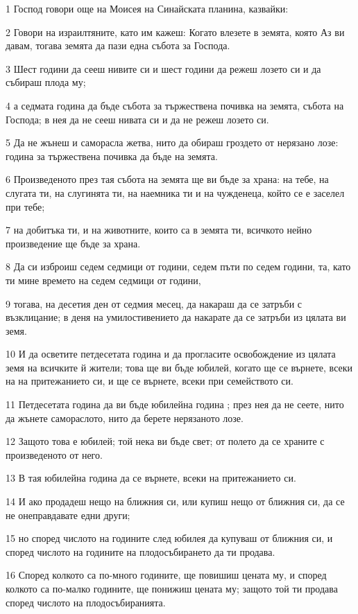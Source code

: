\par 1 Господ говори още на Моисея на Синайската планина, казвайки:
\par 2 Говори на израилтяните, като им кажеш: Когато влезете в земята, която Аз ви давам, тогава земята да пази една събота за Господа.
\par 3 Шест години да сееш нивите си и шест години да режеш лозето си и да събираш плода му;
\par 4 а седмата година да бъде събота за тържествена почивка на земята, събота на Господа; в нея да не сееш нивата си и да не режеш лозето си.
\par 5 Да не жънеш и саморасла жетва, нито да обираш гроздето от нерязано лозе: година за тържествена почивка да бъде на земята.
\par 6 Произведеното през тая събота на земята ще ви бъде за храна: на тебе, на слугата ти, на слугинята ти, на наемника ти и на чужденеца, който се е заселел при тебе;
\par 7 на добитъка ти, и на животните, които са в земята ти, всичкото нейно произведение ще бъде за храна.
\par 8 Да си изброиш седем седмици от години, седем пъти по седем години, та, като ти мине времето на седем седмици от години,
\par 9 тогава, на десетия ден от седмия месец, да накараш да се затръби с възклицание; в деня на умилостивението да накарате да се затръби из цялата ви земя.
\par 10 И да осветите петдесетата година и да прогласите освобождение из цялата земя на всичките й жители; това ще ви бъде юбилей, когато ще се върнете, всеки на на притежанието си, и ще се върнете, всеки при семейството си.
\par 11 Петдесетата година да ви бъде юбилейна година ; през нея да не сеете, нито да жънете самораслото, нито да берете нерязаното лозе.
\par 12 Защото това е юбилей; той нека ви бъде свет; от полето да се храните с произведеното от него.
\par 13 В тая юбилейна година да се върнете, всеки на притежанието си.
\par 14 И ако продадеш нещо на ближния си, или купиш нещо от ближния си, да се не онеправдавате едни други;
\par 15 но според числото на годините след юбилея да купуваш от ближния си, и според числото на годините на плодосъбирането да ти продава.
\par 16 Според колкото са по-много годините, ще повишиш цената му, и според колкото са по-малко годините, ще понижиш цената му; защото той ти продава според числото на плодосъбиранията.
